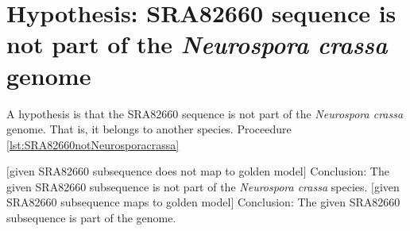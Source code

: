 \documentclass[letter,12pt]{article}
\begin{document}





\section{Hypothesis: SRA82660 sequence is not part of the {\it Neurospora crassa} genome}
\label{sec:Hypothesis}


A hypothesis is that the SRA82660 sequence is not part of the {\it Neurospora crassa} genome. That is, it belongs to another species. Proceedure \ref{lst:SRA82660notNeurosporacrassa}


\begin{codebox}
\label{lst:SRA82660notNeurosporacrassa}
\zi {}
\li	\If $[$given SRA82660 subsequence does not map to golden model$]$
	\Then
\li		Conclusion: The given SRA82660 subsequence is not part of the {\it Neurospora crassa} species.
\li	\ElseIf $[$given SRA82660 subsequence maps to golden model$]$
	\Then
\li		Conclusion: The given SRA82660 subsequence is part of the genome.
\li	
	\End
\li	\Return
\end{codebox}


















%
%
%

{\linespread{1}

%

}
\end{document}
